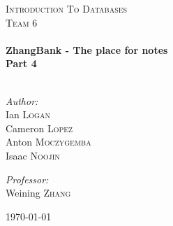 \begin{titlepage}
 
\begin{center}
 
 
\textsc{\LARGE Introduction To Databases}\\[1.5cm]
 
\textsc{\Large Team 6}\\[0.5cm]
 
\HRule \\[0.4cm]
{ \huge \bfseries ZhangBank - The place for notes\\Part 4}\\[0.4cm]
 
\HRule \\[1.5cm]
 
\begin{minipage}{0.4\textwidth}
\begin{flushleft} \large
\emph{Author:}\\
Ian \textsc{Logan}\\ Cameron \textsc{Lopez}\\ Anton
\textsc{Moczygemba}\\ Isaac \textsc{Noojin}
\end{flushleft}
\end{minipage}
\begin{minipage}{0.4\textwidth}
\begin{flushright} \large
\emph{Professor:} \\
Weining \textsc{Zhang}
\end{flushright}
\end{minipage}
 
\vfill
 
{\large \today}
 
\end{center}
 
\end{titlepage}